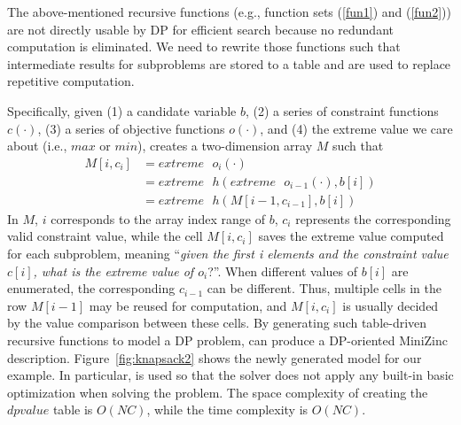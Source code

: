 The above-mentioned recursive functions (e.g., function sets (\ref{fun1}) and (\ref{fun2})) are not directly usable by DP for efficient search because no redundant computation is eliminated. 
We need to rewrite those functions 
such that intermediate results for subproblems are stored to a table and are used to replace repetitive computation. 

Specifically, given (1) a candidate variable $b$, (2) a series of constraint functions $c(\cdot)$, (3) a series of objective functions $o(\cdot)$, and (4) the extreme value we care about (i.e., $max$ or $min$), \tool creates a two-dimension array $M$ such that 
\begin{align}
    M[i, c_i]&=extreme\text{ }o_i(\cdot) \nonumber\\
           &=extreme\text{ }h(extreme\text{ }o_{i-1}(\cdot), b[i]) \nonumber \\
           &=extreme\text{ }h(M[i-1, c_{i-1}], b[i]) \tag{3.5}
\end{align}
In $M$, $i$ corresponds to the array index range of $b$,
$c_i$ represents the corresponding valid constraint value, while the cell $M[i, c_i]$ saves the extreme value computed for each subproblem, meaning ``\emph{given the first i elements and the constraint value $c[i]$, what is the extreme value of $o_i$}?''. When different values of $b[i]$ are enumerated, the corresponding $c_{i-1}$ can be different. Thus, multiple cells in the row $M[i-1]$ may be reused for computation, and $M[i, c_i]$ is usually decided
by the value comparison between these cells. 
By generating such table-driven recursive functions to model a DP problem, \tool can produce a DP-oriented MiniZinc description. Figure~\ref{fig:knapsack2} shows the newly generated model for our example. In particular,  is used so that the solver does not apply any built-in basic optimization when solving the problem. 
The space complexity of creating the $dpvalue$ table is $O(NC)$, while the time complexity is $O(NC)$. 


